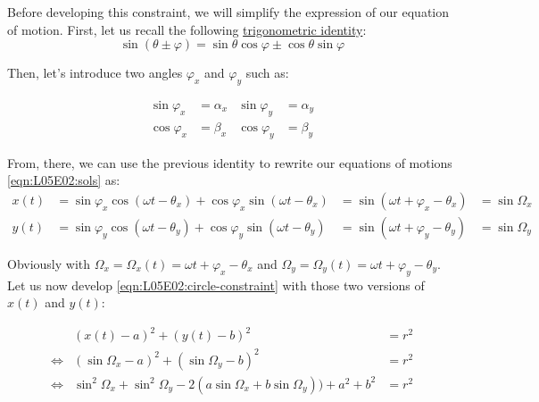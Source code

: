 \documentclass[solutions.tex]{subfiles}
\begin{document}
Before developing this constraint, we will simplify
the expression of our equation of motion. First, let us recall
the following
\href{https://en.wikipedia.org/wiki/List\_of\_trigonometric\_identities\#Angle\_sum\_and\_difference\_identities}
{trigonometric identity}:
\[
	\sin(\theta \pm \varphi) = \sin\theta\cos\varphi \pm \cos\theta\sin\varphi
\]

Then, let's introduce two angles $\varphi_x$ and $\varphi_y$ such as:

\begin{equation*} \begin{aligned}
	\sin\varphi_x &= \alpha_x & \sin\varphi_y &= \alpha_y \\
	\cos\varphi_x &= \beta_x  & \cos\varphi_y &= \beta_y
\end{aligned} \end{equation*}

From, there, we can use the previous identity to rewrite our equations of
motions \eqref{eqn:L05E02:sols} as:
\begin{equation} \label{eqn:L0502:sols-simpl} \begin{aligned}
	x(t) &= \sin\varphi_x\cos(\omega t-\theta_x)+\cos\varphi_x\sin(\omega t-\theta_x)
	&= \sin(\omega t + \varphi_x - \theta_x) &= \sin\Omega_x \\
	y(t) &= \sin\varphi_y\cos(\omega t-\theta_y)+\cos\varphi_y\sin(\omega t-\theta_y)
	&= \sin(\omega t + \varphi_y -\theta_y) &= \sin\Omega_y
\end{aligned} \end{equation}

Obviously with $\Omega_x = \Omega_x(t) = \omega t + \varphi_x - \theta_x$
and $\Omega_y = \Omega_y(t) = \omega t + \varphi_y -\theta_y$. \\

Let us now develop \eqref{eqn:L05E02:circle-constraint} with those two
versions of $x(t)$ and $y(t)$:

\begin{equation*} \begin{aligned}
	~ & (x(t)-a)^2+(y(t)-b)^2 &= r^2 \\
	\Leftrightarrow & (\sin\Omega_x - a)^2
	+(\sin\Omega_y-b)^2 &= r^2 \\
	\Leftrightarrow & \sin^2\Omega_x+\sin^2\Omega_y -2(a\sin\Omega_x+b\sin\Omega_y))+a^2+b^2 &= r^2 \\
\end{aligned} \end{equation*}
\end{document}
